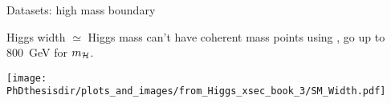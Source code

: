\begin{frame}{Datasets: high mass boundary}

\begin{minipage}[c]{.52\textwidth}
\manip Higgs width $\simeq$ Higgs mass 
\submanip can't have coherent mass points using \higgsML,
\submanip go up to \SI{800}{\GeV} for $m_{\mathcal{H}}$.
\end{minipage}
\hfill
\begin{minipage}[c]{.45\textwidth}
\vspace{-\baselineskip}
\begin{center}
\texttt{[image: \\PhDthesisdir/plots\_and\_images/from\_Higgs\_xsec\_book\_3/SM\_Width.pdf]}
\end{center}
\end{minipage}

\end{frame}

